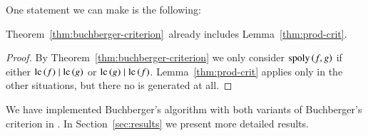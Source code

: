 One statement we can make is the following:

\begin{proposition}
Theorem~\ref{thm:buchberger-criterion}\, already includes
Lemma~\ref{thm:prod-crit}.
\label{prop:prod-crit-useless}
\end{proposition}

\begin{proof}
By Theorem~\ref{thm:buchberger-criterion} we only consider $\mathrm{spoly}\left({f},{g}\right)$ if either
$\mathrm{lc}\left({f}\right) \mid \mathrm{lc}\left({g}\right)$ or $\mathrm{lc}\left({g}\right) \mid \mathrm{lc}\left({f}\right)$. Lemma~\ref{thm:prod-crit} applies only
in the other situations, but there no \spt is generated at all.
\end{proof}

We have implemented Buchberger's algorithm with both variants of Buchberger's
criterion in \singular. In Section~\ref{sec:results} we present more detailed
results.
